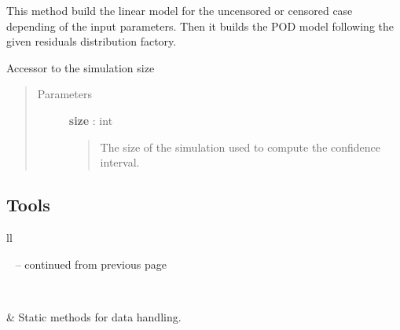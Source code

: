 \documentclass[letterpaper,10pt,english]{sphinxmanual}
\begin{document}
\begin{fulllineitems}
\begin{fulllineitems}
This method build the linear model for the uncensored or censored case
depending of the input parameters. Then it builds the POD model
following the given residuals distribution factory.

\end{fulllineitems}


\begin{fulllineitems}
\label{_generated/otpod.UnivariateLinearModelPOD:otpod.UnivariateLinearModelPOD.setSimulationSize}
Accessor to the simulation size
\begin{quote}\begin{description}
\item[{Parameters}] \leavevmode
\textbf{size} : int
\begin{quote}

The size of the simulation used to compute the confidence interval.
\end{quote}

\end{description}\end{quote}

\end{fulllineitems}


\end{fulllineitems}



\subsection{Tools}
\label{user_manual:tools}
\begin{longtable}{ll}
\hline
\endfirsthead

%
{{\textsf{\tablename\ \thetable{} -- continued from previous page}}} \\
\hline
\endhead

\hline {} \\ \hline
\endfoot

\endlastfoot


{\hyperref[_generated/otpod.DataHandling:otpod.DataHandling]{\emph{}}}
 & 
Static methods for data handling.
\\
\hline\end{longtable}
\end{document}
